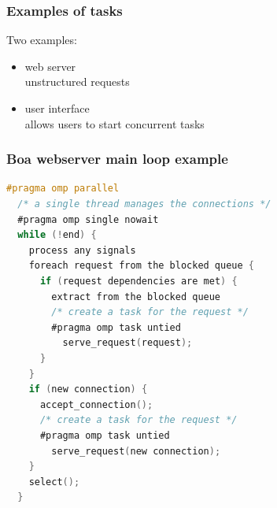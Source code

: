 \begin{frame}
  \frametitle{Examples of tasks}
  

\Large
   Two examples:
   \begin{itemize}
     \item web server\\ \quad unstructured requests
     \item user interface\\ \quad allows users to start concurrent tasks
   \end{itemize}

  


\end{frame}

\begin{frame}[fragile]
  \frametitle{Boa webserver main loop example}
  

{\small
\begin{lstlisting}[language=C,morekeywords={foreach,pragma,omp,parallel,single,nowait,task,untied,barrier,taskyield}]
#pragma omp parallel
  /* a single thread manages the connections */
  #pragma omp single nowait
  while (!end) {
    process any signals
    foreach request from the blocked queue {
      if (request dependencies are met) {
        extract from the blocked queue
        /* create a task for the request */
        #pragma omp task untied
          serve_request(request);
      }
    }
    if (new connection) {
      accept_connection();
      /* create a task for the request */
      #pragma omp task untied
        serve_request(new connection);
    }
    select();
  }
\end{lstlisting}
}

  


\end{frame}

